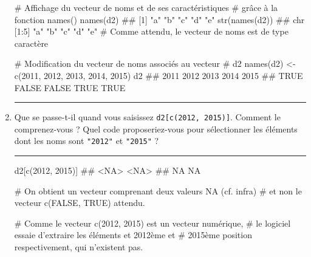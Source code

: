 \documentclass[12pt,twosided, notitlepage]{book}
\newenvironment{Shaded}{}{}
\newcommand{\KeywordTok}[1]{\textcolor[rgb]{0.00,0.00,1.00}{{#1}}}
\newcommand{\DecValTok}[1]{{#1}}
\newcommand{\StringTok}[1]{\textcolor[rgb]{0.00,0.50,0.50}{{#1}}}
\newcommand{\CommentTok}[1]{\textcolor[rgb]{0.00,0.50,0.00}{{#1}}}
\newcommand{\NormalTok}[1]{{#1}}
\newif \ifsol
\renewenvironment{Shaded}{\begin{snugshade}}{\end{snugshade}}
\begin{document}
\begin{enumerate}
\begin{Shaded}
\begin{Highlighting}[]
\CommentTok{# Affichage du vecteur de noms et de ses caractéristiques}
\CommentTok{# grâce à la fonction names()}
\KeywordTok{names}\NormalTok{(d2)}
  \NormalTok{## [1] "a" "b" "c" "d" "e"}
\KeywordTok{str}\NormalTok{(}\KeywordTok{names}\NormalTok{(d2))}
  \NormalTok{##  chr [1:5] "a" "b" "c" "d" "e"}
\CommentTok{# Comme attendu, le vecteur de noms est de type caractère}

\CommentTok{# Modification du vecteur de noms associés au vecteur}
\CommentTok{# d2}
\KeywordTok{names}\NormalTok{(d2) <-}\StringTok{ }\KeywordTok{c}\NormalTok{(}\DecValTok{2011}\NormalTok{, }\DecValTok{2012}\NormalTok{, }\DecValTok{2013}\NormalTok{, }\DecValTok{2014}\NormalTok{, }\DecValTok{2015}\NormalTok{)}
\NormalTok{d2}
  \NormalTok{##  2011  2012  2013  2014  2015 }
  \NormalTok{##  TRUE FALSE FALSE  TRUE  TRUE}
\end{Highlighting}
\end{Shaded}

  \begin{center} \rule{0.5\linewidth}{\linethickness}\end{center}

  \bigskip  \fi 
\item
  Que se passe-t-il quand vous saisissez
  \texttt{d2{[}c(2012,\ 2015){]}}\index{\texttt{[}}. Comment le
  comprenez-vous ? Quel code proposeriez-vous pour sélectionner les
  éléments dont les noms sont \texttt{"2012"} et \texttt{"2015"} ?

  \ifsol  \textbf{Indication} Quel est le type du vecteur de noms
  associé à \texttt{d2} ?\fi  \ifsol 

  \begin{center} \rule{0.5\linewidth}{\linethickness}\end{center}

\begin{Shaded}
\begin{Highlighting}[]
\NormalTok{d2[}\KeywordTok{c}\NormalTok{(}\DecValTok{2012}\NormalTok{, }\DecValTok{2015}\NormalTok{)]}
  \NormalTok{## <NA> <NA> }
  \NormalTok{##   NA   NA}

\CommentTok{# On obtient un vecteur comprenant deux valeurs NA (cf. infra)}
\CommentTok{# et non le vecteur c(FALSE, TRUE) attendu.}

\CommentTok{# Comme le vecteur c(2012, 2015) est un vecteur numérique, }
\CommentTok{# le logiciel essaie d'extraire les éléments et 2012ème et }
\CommentTok{# 2015ème position respectivement, qui n'existent pas.}


\end{Highlighting}
\end{Shaded}
\end{enumerate}
\end{document}
